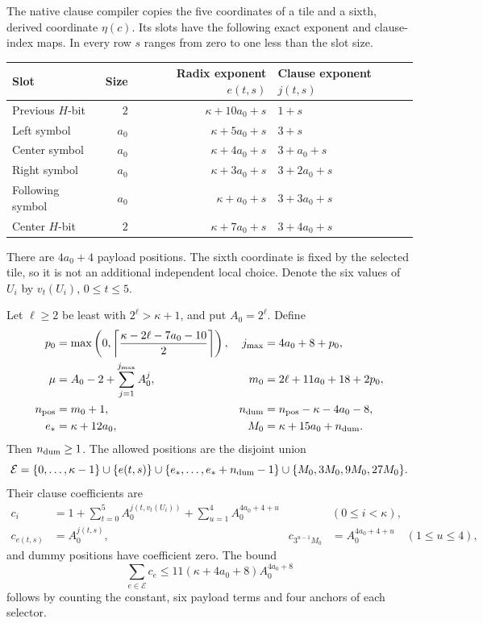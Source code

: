 The native clause compiler copies the five coordinates of a tile and a
sixth, derived coordinate $\eta(c)$.  Its slots have the following exact
exponent and clause-index maps.  In every row $s$ ranges from zero to one
less than the slot size.
\begin{center}
\begin{tabular}{lrrl}
\toprule
Slot & Size & Radix exponent $e(t,s)$ & Clause exponent $j(t,s)$\\
\midrule
Previous $H$-bit & $2$ & $\kappa+10a_0+s$ & $1+s$\\
Left symbol & $a_0$ & $\kappa+5a_0+s$ & $3+s$\\
Center symbol & $a_0$ & $\kappa+4a_0+s$ & $3+a_0+s$\\
Right symbol & $a_0$ & $\kappa+3a_0+s$ & $3+2a_0+s$\\
Following symbol & $a_0$ & $\kappa+a_0+s$ & $3+3a_0+s$\\
Center $H$-bit & $2$ & $\kappa+7a_0+s$ & $3+4a_0+s$\\
\bottomrule
\end{tabular}
\end{center}
There are $4a_0+4$ payload positions.  The sixth coordinate is fixed by
the selected tile, so it is not an additional independent local choice.
Denote the six values of $U_i$ by $v_t(U_i)$, $0\le t\le5$.

Let $\ell\ge2$ be least with $2^\ell>\kappa+1$, and put $A_0=2^\ell$.
Define
\begin{align*}
 p_0&=\max\left(0,\left\lceil
       \frac{\kappa-2\ell-7a_0-10}{2}\right\rceil\right),&
 j_{\max}&=4a_0+8+p_0,\\
 \mu&=A_0-2+\sum_{j=1}^{j_{\max}}A_0^j,&
 m_0&=2\ell+11a_0+18+2p_0,\\
 n_{\rm pos}&=m_0+1,&
 n_{\rm dum}&=n_{\rm pos}-\kappa-4a_0-8,\\
 e_*&=\kappa+12a_0,&
 M_0&=\kappa+15a_0+n_{\rm dum}.
\end{align*}
Then $n_{\rm dum}\ge1$.  The allowed positions are the disjoint union
\[
 \mathcal E=\{0,\ldots,\kappa-1\}
 \cup\{e(t,s)\}
 \cup\{e_*,\ldots,e_*+n_{\rm dum}-1\}
 \cup\{M_0,3M_0,9M_0,27M_0\}.
\]
Their clause coefficients are
\begin{align*}
 c_i&=1+\sum_{t=0}^{5}A_0^{j(t,v_t(U_i))}
          +\sum_{u=1}^{4}A_0^{4a_0+4+u}
              &&(0\le i<\kappa),\\
 c_{e(t,s)}&=A_0^{j(t,s)},&
 c_{3^{u-1}M_0}&=A_0^{4a_0+4+u}\quad(1\le u\le4),
\end{align*}
and dummy positions have coefficient zero.  The bound
\[
 \sum_{e\in\mathcal E}c_e
 \le11(\kappa+4a_0+8)A_0^{4a_0+8}
\]
follows by counting the constant, six payload terms and four anchors of
each selector.

